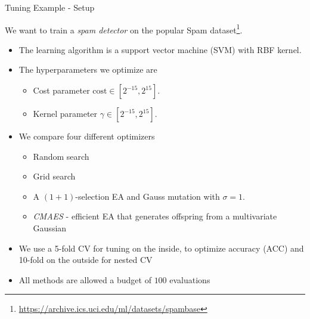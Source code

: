 \begin{frame}{Tuning Example - Setup}

    We want to train a \textit{spam detector} on the popular Spam dataset\footnote{\url{https://archive.ics.uci.edu/ml/datasets/spambase}}.

    \begin{itemize}
        \item The learning algorithm is a support vector machine (SVM) with RBF kernel.
        \item The hyperparameters we optimize are
            \begin{itemize}
                \item Cost parameter $\text{cost} \in [2^{-15}, 2^{15}]$.
                \item Kernel parameter $\gamma \in [2^{-15}, 2^{15}]$.
            \end{itemize}
        \item We compare four different optimizers
            \begin{itemize}
                \item Random search
                \item Grid search
                \item A $(1+1)$-selection EA and Gauss mutation with $\sigma = 1$.
                \item \textit{CMAES} - efficient EA that generates offspring from a multivariate Gaussian
            \end{itemize}
        \item We use a 5-fold CV for tuning on the inside, to optimize accuracy (ACC) and 10-fold on the outside for nested CV
        \item All methods are allowed a budget of $100$ evaluations
    \end{itemize}

\end{frame}

